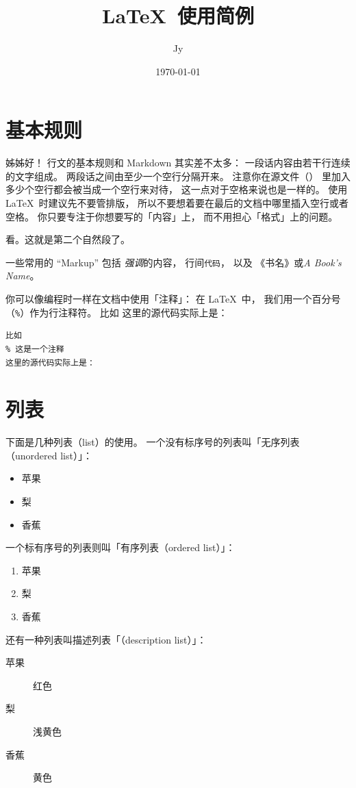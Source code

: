 \documentclass{article}
\title{\LaTeX\ 使用简例}
\author{Jy}
\date{\today}
\def\code{\lstinline}
\newcommand*\propername[1]{\textit{#1}}
\newcommand*\propernameZH[1]{《#1》}
\begin{document}
\maketitle %


\section{基本规则}

姊姊好！
行文的基本规则和 Markdown 其实差不太多：
一段话内容由若干行连续的文字组成。
两段话之间由至少一个空行分隔开来。
注意你在源文件（）
里加入多少个空行都会被当成一个空行来对待，
这一点对于空格来说也是一样的。
使用 \LaTeX\ 时建议先不要管排版，
所以不要想着要在最后的文档中哪里插入空行或者空格。
你只要专注于你想要写的「内容」上，
而不用担心「格式」上的问题。

看。这就是第二个自然段了。

一些常用的 ``Markup'' 包括%
    \emph{强调}的内容，
    行间\code`代码`，
    以及
    \propernameZH{书名}或\propername{A Book's Name}。

你可以像编程时一样在文档中使用「注释」：
在 \LaTeX\ 中，
我们用一个百分号（\code`%
比如
这里的源代码实际上是：
\begin{lstlisting}[language={[LaTeX]TeX}]
比如
% 这是一个注释
这里的源代码实际上是：
\end{lstlisting}

\section{列表}

下面是几种列表（list）的使用。
一个没有标序号的列表叫「无序列表（unordered list）」：
\begin{itemize}
\item
    苹果
\item
    梨
\item
    香蕉
\end{itemize}
一个标有序号的列表则叫「有序列表（ordered list）」：
\begin{enumerate}
\item
    苹果
\item
    梨
\item
    香蕉
\end{enumerate}
还有一种列表叫描述列表「（description list）」：
\begin{description}
\item[苹果]
    红色
\item[梨]
    浅黄色
\item[香蕉]
    黄色
\end{description}
\end{document}
